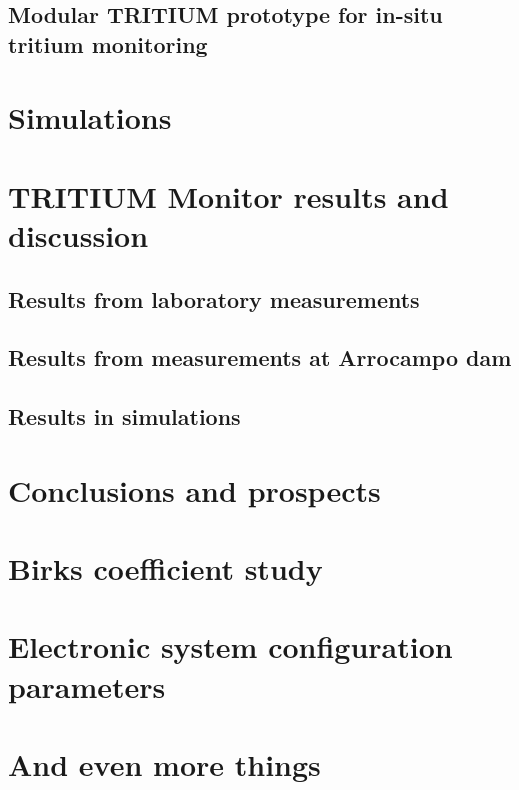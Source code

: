 \documentclass[12pt,a4paper]{book}
\begin{document}
	\section[Modular TRITIUM prototype]{Modular TRITIUM prototype for in-situ tritium monitoring}
	\newpage

\chapter{Simulations}  \label{chap:Simulations}
\newpage
	
\chapter[Results and discussion]{TRITIUM Monitor results and discussion}\label{chap:Results}
	\section{Results from laboratory measurements}
	\newpage
		
	\section[Results in Arrocampo dam]{Results from measurements at Arrocampo dam}
	\newpage
	
	\section{Results in simulations}
	\newpage		

\chapter{Conclusions and prospects}  \label{chap:Conclusions}

\newpage


\appendix
\appendixpage
\noappendicestocpagenum
\addappheadtotoc

\chapter{Birks coefficient study}\label{App:BirksA}


\chapter{Electronic system configuration parameters}\label{App:B}


\chapter{And even more things}\label{App:C}



\end{document}
